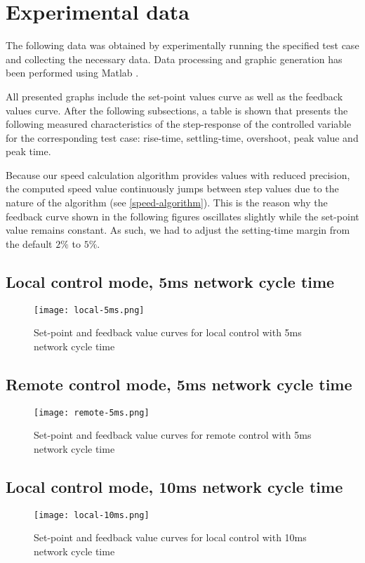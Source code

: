 \section{Experimental data}
The following data was obtained by experimentally running the specified test case and collecting the necessary data.
Data processing and graphic generation has been performed using Matlab \cite{sw:matlab}.

All presented graphs include the set-point values curve as well as the feedback values curve.
After the following subsections, a table is shown that presents the following measured characteristics of the step-response of the controlled variable for the corresponding test case: rise-time, settling-time, overshoot, peak value and peak time.

Because our speed calculation algorithm provides values with reduced precision, the computed speed value continuously jumps between step values due to the nature of the algorithm (see \autoref{speed-algorithm}).
This is the reason why the feedback curve shown in the following figures oscillates slightly while the set-point value remains constant.
As such, we had to adjust the setting-time margin from the default $2\%$ to $5\%$.

\subsection*{Local control mode, 5ms network cycle time}
\begin{figure}[H]
	\centering
	\texttt{[image: local-5ms.png]}
	\caption{Set-point and feedback value curves for local control with 5ms network cycle time}
	\label{fig:local-5ms}
\end{figure}

\subsection*{Remote control mode, 5ms network cycle time}
\begin{figure}[H]
	\centering
	\texttt{[image: remote-5ms.png]}
	\caption{Set-point and feedback value curves for remote control with 5ms network cycle time}
	\label{fig:remote-5ms}
\end{figure}

\subsection*{Local control mode, 10ms network cycle time}
\begin{figure}[H]
	\centering
	\texttt{[image: local-10ms.png]}
	\caption{Set-point and feedback value curves for local control with 10ms network cycle time}
	\label{fig:local-10ms}
\end{figure}

